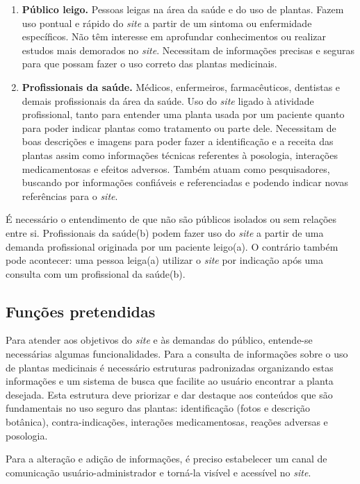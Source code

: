 \begin{enumerate}
\def\labelenumi{\alph{enumi})}
\item
  \textbf{Público leigo.} Pessoas leigas na área da saúde e do uso de plantas. Fazem uso pontual e rápido do \emph{site} a partir de um sintoma ou enfermidade específicos. Não têm interesse em aprofundar conhecimentos ou realizar estudos mais demorados no \emph{site}. Necessitam de informações precisas e seguras para que possam fazer o uso correto das plantas medicinais.
\item
  \textbf{Profissionais da saúde.} Médicos, enfermeiros, farmacêuticos, dentistas e demais profissionais da área da saúde. Uso do \emph{site} ligado à atividade profissional, tanto para entender uma planta usada por um paciente quanto para poder indicar plantas como tratamento ou parte dele. Necessitam de boas descrições e imagens para poder fazer a identificação e a receita das plantas assim como informações técnicas referentes à posologia, interações medicamentosas e efeitos adversos. Também atuam como pesquisadores, buscando por informações confiáveis e referenciadas e podendo indicar novas referências para o \emph{site}.
\end{enumerate}

É necessário o entendimento de que não são públicos isolados ou sem relações entre si. Profissionais da saúde(b) podem fazer uso do \emph{site} a partir de uma demanda profissional originada por um paciente leigo(a). O contrário também pode acontecer: uma pessoa leiga(a) utilizar o \emph{site} por indicação após uma consulta com um profissional da saúde(b).

\subsection{Funções pretendidas}\label{funcoes-pretendidas}

Para atender aos objetivos do \emph{site} e às demandas do público, entende-se necessárias algumas funcionalidades. Para a consulta de informações sobre o uso de plantas medicinais é necessário estruturas padronizadas organizando estas informações e um sistema de busca que facilite ao usuário encontrar a planta desejada. Esta estrutura deve priorizar e dar destaque aos conteúdos que são fundamentais no uso seguro das plantas: identificação (fotos e descrição botânica), contra-indicações, interações medicamentosas, reações adversas e posologia.

Para a alteração e adição de informações, é preciso estabelecer um canal de comunicação usuário-administrador e torná-la visível e acessível no \emph{site}.

